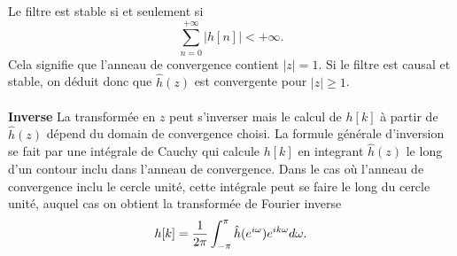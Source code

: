 Le filtre est stable si et seulement si
\[
\sum_{n=0}^{+\infty} |h[n]| < +\infty .
\]
Cela signifie que l'anneau de convergence contient $|z| = 1$.
Si le filtre est causal et stable, on d\'eduit donc que
$\hat h(z)$ est convergente pour $|z| \geq 1$.
\\
\\
{\bf Inverse}
%
%
%
%
%
La transform\'ee en $z$ peut s'inverser mais le calcul de
$h[k]$ \`a partir de $\hat h (z)$ d\'epend du domain de
convergence choisi. La formule g\'en\'erale d'inversion se
fait par une int\'egrale de Cauchy qui calcule $h[k]$
en integrant $\hat h (z)$ le long d'un contour inclu
dans l'anneau de convergence.
Dans le cas o\`u l'anneau de convergence
inclu le cercle unit\'e, cette int\'egrale peut se faire le
long du cercle unit\'e, auquel cas on obtient la transform\'ee
de Fourier inverse
\[
h[k] = \frac 1 {2 \pi} \int_{-\pi}^{\pi}
\hat h ({e ^{i \omega}}) e^{i k {\omega}} d{\omega} .
\]

